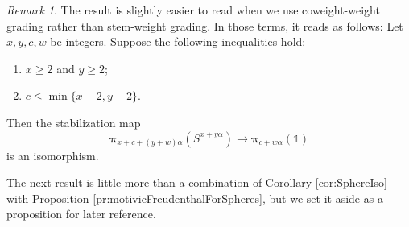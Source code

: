 \documentclass[11pt, oneside, dvipsnames, svgnames, table, final]{amsart}
\theoremstyle{plain}
\theoremstyle{definition}
\theoremstyle{remark}
\newtheorem{remark}[thm]{Remark}
\newcommand{\bpi}{\bm{\pi}}
\newcommand{\<}[1]{{\langle}#1 {\rangle}}
\newcommand{\one}{\mathbb{1}}
\begin{document}
\begin{remark}\label{rem:motivicFreudenthalForSpheresCoweight}
  The result is slightly easier to read when we use coweight-weight grading rather than stem-weight grading. In those terms, it reads as follows:
  Let $x,y, c,w$ be integers. Suppose the following inequalities hold:
  \begin{enumerate}
  \item $x \ge 2$ and $y \ge 2$;
  \item $c \le \min\{x-2, y-2\}$.
  \end{enumerate}
  Then the stabilization map
  \[ \bpi_{x+c + (y+w)\alpha} (S^{x+y\alpha}) \to \bpi_{c+w\alpha}(\one) \]
  is an isomorphism. 
\end{remark}

The next result is little more than a combination of Corollary \ref{cor:SphereIso} with Proposition \ref{pr:motivicFreudenthalForSpheres}, but we set it aside as a proposition for later reference.
\end{document}
